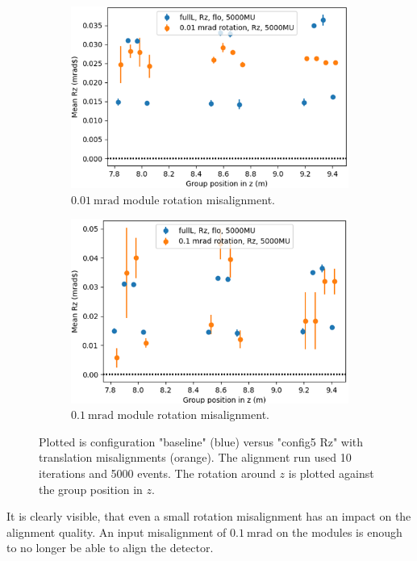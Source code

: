 \begin{figure}
  \centering
  \begin{subfigure}[b]{0.48\textwidth}
    \centering
    \includegraphics[width=\textwidth]{plots/misalign_rota/001_rot_Rz.png}
    \caption{$\SI{0.01}{\milli\radian}$ module rotation misalignment.}
    \label{fig:001Rz}
  \end{subfigure}
  \hfill
  \begin{subfigure}[b]{0.48\textwidth}
    \centering
    \includegraphics[width=\textwidth]{plots/misalign_rota/01_rot_Rz.png}
    \caption{$\SI{0.1}{\milli\radian}$ module rotation misalignment.}
    \label{fig:01Rz}
  \end{subfigure}
  \caption{Plotted is configuration "baseline" (blue) versus "config5 Rz" with translation misalignments (orange). The alignment run used 10 iterations and 5000 events. The rotation around $z$ is plotted against the group position in $z$.}
  \label{fig:mis_rot_Rz}
\end{figure}

It is clearly visible, that even a small rotation misalignment has an impact on the alignment quality. An input misalignment of $\SI{0.1}{\milli\radian}$ on the modules is enough to no longer be able to align the detector.
